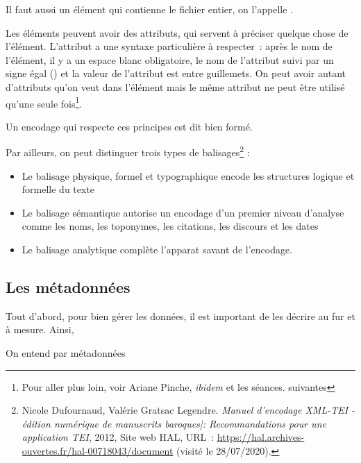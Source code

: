 Il faut aussi un élément qui contienne le fichier entier, on l'appelle .

Les éléments peuvent avoir des attributs, qui servent à préciser quelque chose de l'élément. L'attribut a une syntaxe particulière à respecter~:  après le nom de l’élément, il y a un espace blanc obligatoire, le nom de l'attribut suivi par un signe égal (\citecode{=}) et la valeur de l’attribut est entre guillemets. On peut avoir autant d’attributs qu’on veut dans l'élément mais le même attribut ne peut être utilisé qu’une seule fois\footnote{Pour aller plus loin, voir Ariane Pinche, \emph{ibidem} et les séances. suivantes}.

Un encodage qui respecte ces principes est dit bien formé. 

Par ailleurs, on peut distinguer trois types de balisages\footnote{Nicole Dufournaud, Valérie Gratsac Legendre. \emph{Manuel d’encodage XML-TEI - édition numérique de manuscrits baroques|: Recommandations pour une application TEI}, 2012, Site web HAL, URL~: \url{https://hal.archives-ouvertes.fr/hal-00718043/document} (visité le 28/07/2020).} : 
\begin{itemize}
    \item  Le balisage physique, formel et typographique encode les structures logique et formelle du texte
    \item  Le balisage sémantique autorise un encodage d'un premier niveau d'analyse comme les noms, les toponymes, les citations, les discours et les dates
    \item Le balisage analytique complète l'apparat savant de l'encodage.
\end{itemize}

\subsection{Les métadonnées}

Tout d'abord, pour bien gérer les données, il est important de les décrire au fur et à mesure. Ainsi, 

On entend par métadonnées 
\begin{quote}
\end{quote}

